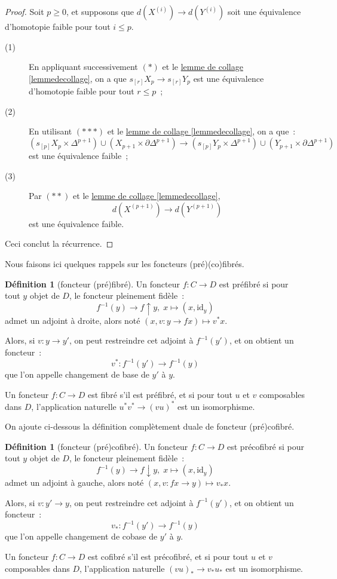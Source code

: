 \documentclass{amsart}
\newcommand{\sref}[2]{\hyperref[#2]{#1 \ref*{#2}}}
\theoremstyle{plain}
\theoremstyle{definition}
\newtheorem{defi}[theo]{Définition}
\theoremstyle{remark}
\newcommand{\id}{\mathrm{id}}
\newcommand{\ra}{\rightarrow}
\newcommand{\lra}{\longrightarrow}
\begin{document}
\begin{proof}
  Soit $p\geq 0$, et supposons que $d(X^{(i)})\ra d(Y^{(i)})$ soit une équivalence d'homotopie faible pour tout $i\leq p$.
  \begin{description}
    \item[(1)] En appliquant successivement $(*)$ et le \sref{lemme de collage}{lemmedecollage}, on a que $s_{[r]}X_p\ra s_{[r]}Y_p$
              est une équivalence d'homotopie faible pour tout $r\leq p$~;
    \item[(2)] En utilisant $(***)$ et le \sref{lemme de collage}{lemmedecollage}, on a que~:
              $$(s_{[p]}X_p\times\Delta^{p+1})\cup (X_{p+1}\times\partial\Delta^{p+1})\ra (s_{[p]}Y_p\times\Delta^{p+1})\cup (Y_{p+1}\times\partial\Delta^{p+1})$$
              est une équivalence faible~;
    \item[(3)] Par $(**)$ et le \sref{lemme de collage}{lemmedecollage},
    $$d(X^{(p+1)})\ra d(Y^{(p+1)})$$
    est une équivalence faible.
  \end{description}
  Ceci conclut la récurrence.
\end{proof}

Nous faisons ici quelques rappels sur les foncteurs (pré)(co)fibrés.

\begin{defi}[foncteur (pré)fibré]
  Un foncteur $f:C\ra D$ est préfibré si pour tout $y$ objet de $D$, le foncteur pleinement fidèle~:
  $$f^{-1}(y)\ra f\uparrow y,\; x\mapsto (x,\id_y)$$
  admet un adjoint à droite, alors noté $(x,v:y\ra fx)\mapsto v^*x$.

  Alors, si $v:y\ra y'$, on peut restreindre cet adjoint à $f^{-1}(y')$, et on obtient un foncteur~:
  $$v^*:f^{-1}(y')\lra f^{-1}(y)$$
  que l'on appelle changement de base de $y'$ à $y$.

  Un foncteur $f:C\ra D$ est fibré s'il est préfibré, et si pour tout $u$ et $v$ composables dans $D$,
  l'application naturelle $u^*v^*\ra (vu)^*$ est un isomorphisme.
\end{defi}

On ajoute ci-dessous la définition complètement duale de foncteur (pré)cofibré.

\begin{defi}[foncteur (pré)cofibré]
  Un foncteur $f:C\ra D$ est précofibré si pour tout $y$ objet de $D$, le foncteur pleinement fidèle~:
  $$f^{-1}(y)\ra f\downarrow y,\; x\mapsto (x,\id_y)$$
  admet un adjoint à gauche, alors noté $(x,v:fx\ra y)\mapsto v_*x$.

  Alors, si $v:y'\ra y$, on peut restreindre cet adjoint à $f^{-1}(y')$, et on obtient un foncteur~:
  $$v_*:f^{-1}(y')\lra f^{-1}(y)$$
  que l'on appelle changement de cobase de $y'$ à $y$.

  Un foncteur $f:C\ra D$ est cofibré s'il est précofibré, et si pour tout $u$ et $v$ composables dans $D$,
  l'application naturelle $(vu)_*\ra v_*u_*$ est un isomorphisme.
\end{defi}
\end{document}
